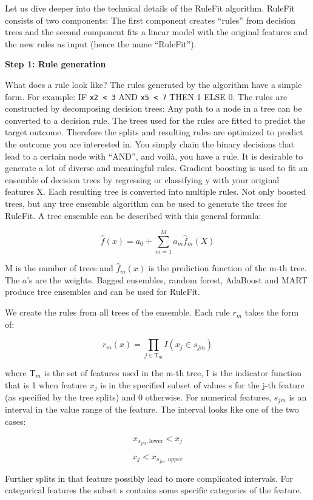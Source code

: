 \documentclass[
  11pt,
]{scrbook}
\begin{document}
Let us dive deeper into the technical details of the RuleFit algorithm.
RuleFit consists of two components:
The first component creates ``rules'' from decision trees and the second component fits a linear model with the original features and the new rules as input (hence the name ``RuleFit'').

\textbf{Step 1: Rule generation}

What does a rule look like?
The rules generated by the algorithm have a simple form.
For example:
IF \texttt{x2\ \textless{}\ 3} AND \texttt{x5\ \textless{}\ 7} THEN 1 ELSE 0.
The rules are constructed by decomposing decision trees:
Any path to a node in a tree can be converted to a decision rule.
The trees used for the rules are fitted to predict the target outcome.
Therefore the splits and resulting rules are optimized to predict the outcome you are interested in.
You simply chain the binary decisions that lead to a certain node with ``AND'', and voilà, you have a rule.
It is desirable to generate a lot of diverse and meaningful rules.
Gradient boosting is used to fit an ensemble of decision trees by regressing or classifying y with your original features X.
Each resulting tree is converted into multiple rules.
Not only boosted trees, but any tree ensemble algorithm can be used to generate the trees for RuleFit.
A tree ensemble can be described with this general formula:

\[\hat{f}(x) = a_0+\sum_{m=1}^M a_m \hat{f}_m(X)\]

M is the number of trees and \(\hat{f}_m(x)\) is the prediction function of the m-th tree.
The \(a\)'s are the weights.
Bagged ensembles, random forest, AdaBoost and MART produce tree ensembles and can be used for RuleFit.

We create the rules from all trees of the ensemble.
Each rule \(r_m\) takes the form of:

\[r_m(x)=\prod_{j\in\text{T}_m}I(x_j\in{}s_{jm})\]

where \(\text{T}_{m}\) is the set of features used in the m-th tree, I is the indicator function that is 1 when feature \(x_j\) is in the specified subset of values s for the j-th feature (as specified by the tree splits) and 0 otherwise.
For numerical features, \(s_{jm}\) is an interval in the value range of the feature.
The interval looks like one of the two cases:

\[x_{s_{jm},\text{lower}}<x_j\]

\[x_j<x_{s_{jm},upper}\]

Further splits in that feature possibly lead to more complicated intervals.
For categorical features the subset s contains some specific categories of the feature.
\end{document}
